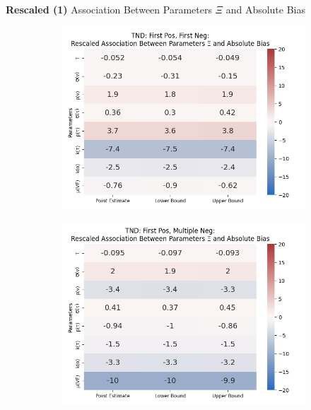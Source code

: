 \documentclass[aspectratio=169]{beamer}
\begin{document}
\begin{frame}{\textbf{Rescaled (1)} Association Between Parameters $\Xi$ and Absolute Bias}
\begin{figure}[H]
		\begin{subfigure}[t]{0.23\linewidth}
			\centering
			\includegraphics[scale=0.25]{VEMethod_Drivers1b_FEest_Realistic_Li_MSpec_Heatmap9.png}
		\end{subfigure}
		\begin{subfigure}[t]{0.23\linewidth}
			\centering
			\includegraphics[scale=0.25]{VEMethod_Drivers1b_FEest_Realistic_Li_MSpec_Heatmap10.png}
		\end{subfigure}
	\end{figure}
\end{frame}
\end{document}
